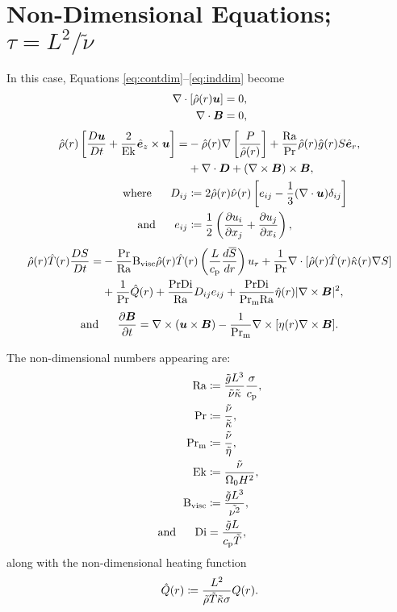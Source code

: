 \documentclass[12pt]{article}
\numberwithin{equation}{section}
\newcommand{\rhond}{\hat{\rho}}
\newcommand{\tmpnd}{\hat{T}}
\newcommand{\gnd}{\hat{g}}
\newcommand{\nund}{\hat{\nu}}
\newcommand{\kappand}{\hat{\kappa}}
\newcommand{\etand}{\hat{\eta}}
\begin{document}
	\section{Non-Dimensional Equations; $\tau=L^2/\tilde{\nu}$}
	In this case, Equations \eqref{eq:contdim}--\eqref{eq:inddim} become 
	\begin{align}
	\Div[\rhond\ofr\vecu] &= 0\label{eq:contndvisc},\\
	\Div \vecb &= 0,
\end{align}
\begin{subequations}\label{eq:momndvisc}
	\begin{align}
		\rhond\ofr\left[\matderiv{\vecu}+\frac{2}{\ek}\ez\times\vecu\right] = &-\rhond\ofr\nabla\left[ \frac{P}{\rhond\ofr} \right] + \frac{\ra}{\pr}\rhond\ofr\gnd\ofr S\er, \nonumber\\
		&+\Div\bm{D} +(\curl\vecb)\times\vecb,\\
		\where D_{ij} &\define 2\rhond\ofr\nund\ofr \left[e_{ij} - \frac{1}{3}(\Div\vecu) \delta_{ij} \right]\\
		\andd e_{ij} &\define \frac{1}{2}\left(\pderiv{u_i}{x_j} + \pderiv{u_j}{x_i} \right),
	\end{align}
\end{subequations}
\begin{align}\label{eq:enndvisc}
	\rhond\ofr\tmpnd\ofr \matderiv{S} = &- \frac{\pr}{\ra}\bvisc\rhond\ofr\tmpnd\ofr \left(\frac{L}{\cp}\frac{d\sref}{dr}\right) \ur + \frac{1}{\pr} \Div[\rhond\ofr \tmpnd\ofr \kappand\ofr \nabla S] \nonumber \\
	&+ \frac{1}{\pr} \hat{Q}(r) + \frac{\pr\di}{\ra} D_{ij}e_{ij} + \frac{\pr\di}{\prm\ra} \etand\ofr|\curl\vecb|^2,
\end{align}
\begin{align}\label{eq:indndvisc}
	\text{and}\ \ \ \ \  \frac{\partial\bm{B}}{\partial t} = \nabla\times(\bm{u}\times\bm{B}) - \frac{1}{{\rm{Pr_m}}} \nabla\times[\eta(r)\nabla\times\bm{B}].
\end{align}	

The non-dimensional numbers appearing are:
\begin{subequations}
\begin{align}
	{\rm{Ra}} &\coloneqq \frac{\tilde{g} L^3}{\tilde{\nu} \tilde{\kappa}} \frac{\sigma}{c_{\rm{p}}},\\ 
	{\rm{Pr}} &\coloneqq \frac{\tilde{\nu}}{\tilde{\kappa}},\\
	{\rm{Pr_m}} &\coloneqq \frac{\tilde{\nu}}{\tilde{\eta}},\\
	{\rm{Ek}} &\coloneqq \frac{\tilde{\nu}}{\Omega_0H^2},\\	
	{\rm{B_{visc}}} &\coloneqq \frac{\tilde{g}L^3}{\tilde{\nu^2}},\\
	\text{and}\ \ \ \ \  {\rm{Di}} &= \frac{\tilde{g}L}{c_{\rm{p}}\tilde{T}},
\end{align}
\end{subequations}
along with the non-dimensional heating function
\begin{align}\label{eq:qnd}
	\hat{Q}(r) \coloneqq \frac{L^2}{\tilde{\rho}\tilde{T}\tilde{\kappa} \sigma} Q(r). 
\end{align}
\end{document}
